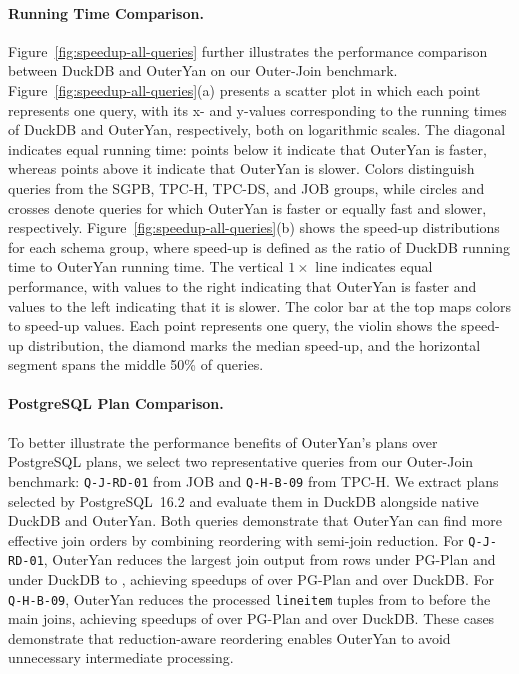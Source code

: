 \paragraph{Running Time Comparison. }Figure~\ref{fig:speedup-all-queries} further illustrates the performance comparison between DuckDB and OuterYan on our Outer-Join benchmark. Figure~\ref{fig:speedup-all-queries}(a) presents a scatter plot in which each point represents one query, with its x- and y-values corresponding to the running times of DuckDB and OuterYan, respectively, both on logarithmic scales. The diagonal indicates equal running time: points below it indicate that OuterYan is faster, whereas points above it indicate that OuterYan is slower. Colors distinguish queries from the SGPB, TPC-H, TPC-DS, and JOB groups, while circles and crosses denote queries for which OuterYan is faster or equally fast and slower, respectively. Figure~\ref{fig:speedup-all-queries}(b) shows the speed-up distributions for each schema group, where speed-up is defined as the ratio of DuckDB running time to OuterYan running time. The vertical $1\times$ line indicates equal performance, with values to the right indicating that OuterYan is faster and values to the left indicating that it is slower. The color bar at the top maps colors to speed-up values. Each point represents one query, the violin shows the speed-up distribution, the diamond marks the median speed-up, and the horizontal segment spans the middle 50\% of queries.

\paragraph{PostgreSQL Plan Comparison. }
To better illustrate the performance benefits of OuterYan's plans over PostgreSQL plans, we select two representative queries from our Outer-Join benchmark: \texttt{Q-J-RD-01} from JOB and \texttt{Q-H-B-09} from TPC-H. We extract plans selected by PostgreSQL~16.2 and evaluate them in DuckDB alongside native DuckDB and OuterYan. Both queries demonstrate that OuterYan can find more effective join orders by combining reordering with semi-join reduction. For \texttt{Q-J-RD-01}, OuterYan reduces the largest join output from  rows under PG-Plan and  under DuckDB to , achieving speedups of  over PG-Plan and  over DuckDB. For \texttt{Q-H-B-09}, OuterYan reduces the processed \texttt{lineitem} tuples from  to  before the main joins, achieving speedups of  over PG-Plan and  over DuckDB. These cases demonstrate that reduction-aware reordering enables OuterYan to avoid unnecessary intermediate processing.


